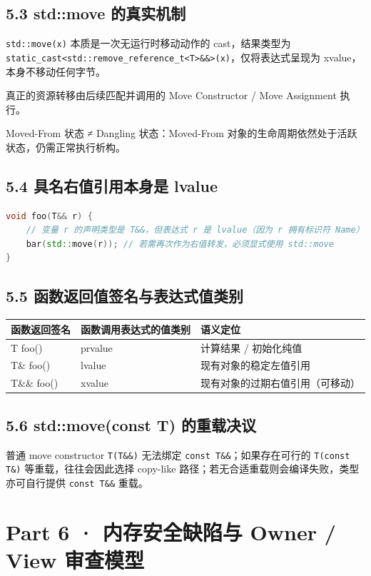 \documentclass[11pt,a4paper]{article}
\begin{document}
\subsection{5.3 std::move 的真实机制}
\texttt{std::move(x)} 本质是一次无运行时移动动作的 cast，结果类型为 \texttt{static\_cast<std::remove\_reference\_t<T>\&\&>(x)}，仅将表达式呈现为 xvalue，本身不移动任何字节。

真正的资源转移由后续匹配并调用的 Move Constructor / Move Assignment 执行。

Moved-From 状态 ≠ Dangling 状态：Moved-From 对象的生命周期依然处于活跃状态，仍需正常执行析构。

\subsection{5.4 具名右值引用本身是 lvalue}
\begin{lstlisting}[language=cpp]
void foo(T&& r) {
    // 变量 r 的声明类型是 T&&，但表达式 r 是 lvalue（因为 r 拥有标识符 Name）
    bar(std::move(r)); // 若需再次作为右值转发，必须显式使用 std::move
}
\end{lstlisting}
\subsection{5.5 函数返回值签名与表达式值类别}
\begin{table}[htbp]
\centering
\small
\begin{tabularx}{\textwidth}{| X | X | X |}
\hline
\rowcolor{codebg}
\textbf{函数返回签名} & \textbf{函数调用表达式的值类别} & \textbf{语义定位} \\ \hline
T foo() & prvalue & 计算结果 / 初始化纯值 \\ \hline
\rowcolor{codebg!50} T\& foo() & lvalue & 现有对象的稳定左值引用 \\ \hline
T\&\& foo() & xvalue & 现有对象的过期右值引用（可移动） \\ \hline
\end{tabularx}
\end{table}
\subsection{5.6 std::move(const T) 的重载决议}
普通 move constructor \texttt{T(T\&\&)} 无法绑定 \texttt{const T\&\&}；如果存在可行的 \texttt{T(const T\&)} 等重载，往往会因此选择 copy-like 路径；若无合适重载则会编译失败，类型亦可自行提供 \texttt{const T\&\&} 重载。

\section{Part 6 · 内存安全缺陷与 Owner / View 审查模型}
\end{document}
